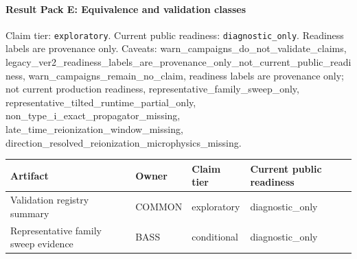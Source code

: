 \paragraph{Result Pack E: Equivalence and validation classes}
Claim tier: \texttt{exploratory}. Current public readiness:
\texttt{diagnostic\_only}. Readiness labels are
provenance only. Caveats: warn\_campaigns\_do\_not\_validate\_claims, legacy\_ver2\_readiness\_labels\_are\_provenance\_only\_not\_current\_public\_readiness, warn\_campaigns\_remain\_no\_claim, readiness labels are provenance only; not current production readiness, representative\_family\_sweep\_only, representative\_tilted\_runtime\_partial\_only, non\_type\_i\_exact\_propagator\_missing, late\_time\_reionization\_window\_missing, direction\_resolved\_reionization\_microphysics\_missing.

\begin{center}
\begin{tabular}{llll}
\hline
Artifact & Owner & Claim tier & Current public readiness \\
\hline
Validation registry summary & COMMON & exploratory & diagnostic\_only \\
Representative family sweep evidence & BASS & conditional & diagnostic\_only \\
\hline
\end{tabular}
\end{center}

